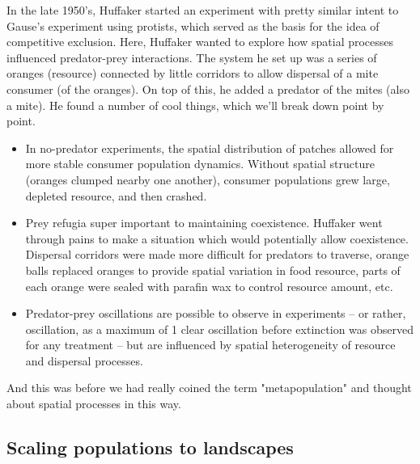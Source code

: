 \documentclass[12pt]{article}
\begin{document}
In the late 1950's, Huffaker started an experiment with pretty similar intent to Gause's experiment using protists, which served as the basis for the idea of competitive exclusion. Here, Huffaker wanted to explore how spatial processes influenced predator-prey interactions. The system he set up was a series of oranges (resource) connected by little corridors to allow dispersal of a mite consumer (of the oranges). On top of this, he added a predator of the mites (also a mite). He found a number of cool things, which we'll break down point by point.


\begin{itemize}

  \item In no-predator experiments, the spatial distribution of patches allowed for more stable consumer population dynamics. Without spatial structure (oranges clumped nearby one another), consumer populations grew large, depleted resource, and then crashed.

  \item Prey refugia super important to maintaining coexistence. Huffaker went through pains to make a situation which would potentially allow coexistence. Dispersal corridors were made more difficult for predators to traverse, orange balls replaced oranges to provide spatial variation in food resource, parts of each orange were sealed with parafin wax to control resource amount, etc. 

  \item Predator-prey oscillations are possible to observe in experiments -- or rather, oscillation, as a maximum of 1 clear oscillation before extinction was observed for any treatment -- but are influenced by spatial heterogeneity of resource and dispersal processes.

\end{itemize}


And this was before we had really coined the term "metapopulation" and thought about spatial processes in this way. 













\bigskip

\subsection*{Scaling populations to landscapes}
\end{document}
